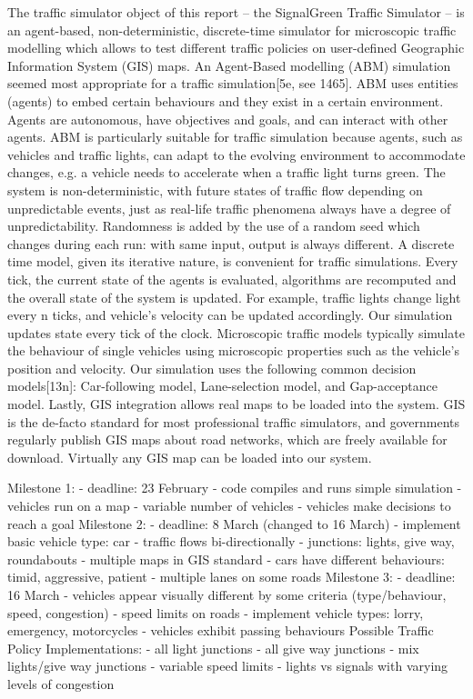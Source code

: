 \documentclass[11pt]{article}
\begin{document}
The traffic simulator object of this report – the SignalGreen Traffic Simulator – is an agent-based, non-deterministic, discrete-time simulator for microscopic traffic modelling which allows to test different traffic policies on user-defined Geographic Information System (GIS) maps. 
An Agent-Based modelling (ABM) simulation seemed most appropriate for a traffic simulation[5e, see 1465]. ABM uses entities (agents) to embed certain behaviours and they exist in a certain environment. Agents are autonomous, have objectives and goals, and can interact with other agents. ABM is particularly suitable for traffic simulation because agents, such as vehicles and traffic lights, can adapt to the evolving environment to accommodate changes, e.g. a vehicle needs to accelerate when a traffic light turns green.
The system is non-deterministic, with future states of traffic flow depending on unpredictable events, just as real-life traffic phenomena always have a degree of unpredictability. Randomness is added by the use of a random seed which changes during each run: with same input, output is always different.  
A discrete time model, given its iterative nature, is convenient for traffic simulations. Every tick, the current state of the agents is evaluated, algorithms are recomputed and the overall state of the system is updated. For example, traffic lights change light every n ticks, and vehicle’s velocity can be updated accordingly. Our simulation updates state every tick of the clock.
Microscopic traffic models typically simulate the behaviour of single vehicles using microscopic properties such as the vehicle’s position and velocity. Our simulation uses the following common decision models[13n]: Car-following model, Lane-selection model, and Gap-acceptance model.
Lastly, GIS integration allows real maps to be loaded into the system. GIS is the de-facto standard for most professional traffic simulators, and governments regularly publish GIS maps about road networks, which are freely available for download. Virtually any GIS map can be loaded into our system.

Milestone 1:
- deadline: 23 February
- code compiles and runs simple simulation
- vehicles run on a map
- variable number of vehicles
- vehicles make decisions to reach a goal
Milestone 2:
- deadline: 8 March (changed to 16 March)
- implement basic vehicle type: car
- traffic flows bi-directionally
- junctions: lights, give way, roundabouts
- multiple maps in GIS standard
- cars have different behaviours: timid, aggressive, patient
- multiple lanes on some roads
Milestone 3:
- deadline: 16 March
- vehicles appear visually different by some criteria (type/behaviour, speed, congestion)
- speed limits on roads
- implement vehicle types: lorry, emergency, motorcycles
- vehicles exhibit passing behaviours
Possible Traffic Policy Implementations:
- all light junctions
- all give way junctions
- mix lights/give way junctions
- variable speed limits
- lights vs signals with varying levels of congestion
\end{document}
